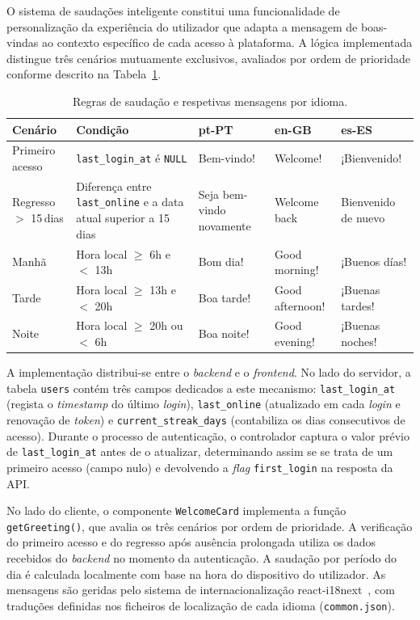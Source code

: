 \documentclass[12pt,a4paper]{report}
\begin{document}
O sistema de saudações inteligente constitui uma funcionalidade de personalização da experiência do utilizador que adapta a mensagem de boas-vindas ao contexto específico de cada acesso à plataforma. A lógica implementada distingue três cenários mutuamente exclusivos, avaliados por ordem de prioridade conforme descrito na Tabela~\ref{tab:greetings}.

\begin{table}[H]
  \centering
  \small
  \begin{tabularx}{\textwidth}{@{}lXp{2.4cm}p{2cm}p{2.2cm}@{}}
    \toprule
    \textbf{Cenário} & \textbf{Condição} & \textbf{pt-PT} & \textbf{en-GB} & \textbf{es-ES} \\
    \midrule
    Primeiro acesso & \texttt{last\_login\_at} é \texttt{NULL} & Bem-vindo! & Welcome! & ¡Bienvenido! \\[4pt]
    Regresso $>$ 15\,dias & Diferença entre \texttt{last\_online} e a data atual superior a 15 dias & Seja bem-vindo novamente & Welcome back & Bienvenido de nuevo \\[4pt]
    Manhã & Hora local $\geq$ 6h e $<$ 13h & Bom dia! & Good morning! & ¡Buenos días! \\[4pt]
    Tarde & Hora local $\geq$ 13h e $<$ 20h & Boa tarde! & Good afternoon! & ¡Buenas tardes! \\[4pt]
    Noite & Hora local $\geq$ 20h ou $<$ 6h & Boa noite! & Good evening! & ¡Buenas noches! \\
    \bottomrule
  \end{tabularx}
  \caption{Regras de saudação e respetivas mensagens por idioma.}
  \label{tab:greetings}
\end{table}

A implementação distribui-se entre o \textit{backend} e o \textit{frontend}. No lado do servidor, a tabela \texttt{users} contém três campos dedicados a este mecanismo: \texttt{last\_\allowbreak login\_\allowbreak at} (regista o \textit{timestamp} do último \textit{login}), \texttt{last\_\allowbreak online} (atualizado em cada \textit{login} e renovação de \textit{token}) e \texttt{current\_\allowbreak streak\_\allowbreak days} (contabiliza os dias consecutivos de acesso). Durante o processo de autenticação, o controlador captura o valor prévio de \texttt{last\_\allowbreak login\_\allowbreak at} antes de o atualizar, determinando assim se se trata de um primeiro acesso (campo nulo) e devolvendo a \textit{flag} \texttt{first\_\allowbreak login} na resposta da API.

No lado do cliente, o componente \texttt{WelcomeCard} implementa a função \texttt{getGreeting()}, que avalia os três cenários por ordem de prioridade. A verificação do primeiro acesso e do regresso após ausência prolongada utiliza os dados recebidos do \textit{backend} no momento da autenticação. A saudação por período do dia é calculada localmente com base na hora do dispositivo do utilizador. As mensagens são geridas pelo sistema de internacionalização react-i18next~\cite{i18next}, com traduções definidas nos ficheiros de localização de cada idioma (\texttt{common.json}).
\end{document}
